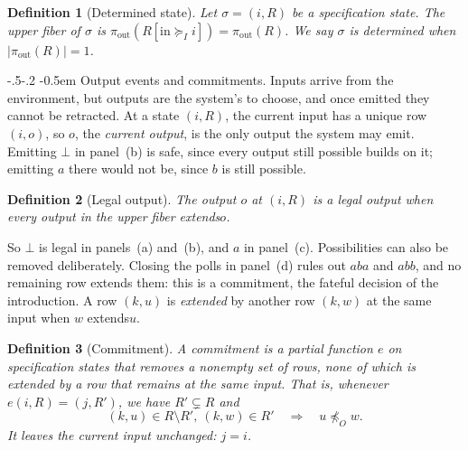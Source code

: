 \documentclass[sigconf]{cidr-2027}
\makeatletter
\newtheorem{definition}{Definition}
\theoremstyle{remark}
\renewcommand\paragraph{\@startsection{paragraph}{4}{\z@}%
  {-.5\baselineskip \@plus -2\p@ \@minus -.2\p@}%
  {-0.5em}%
  {\normalfont\bfseries}}
\newcommand{\OutputOrd}{\preceq_O}
\newcommand{\InputGe}{\succeq_I}
\newcommand{\commitment}{commitment\xspace}
\newcommand{\commitments}{commitments\xspace}
\newcommand{\Commitment}{Commitment\xspace}
\newcommand{\outrel}{extends\xspace}          %
\newcommand{\outrelpast}{extended\xspace}     %
\makeatother
\begin{document}
\begin{definition}[Determined state]
\label{def:determined}
\textcolor{reviewed}{Let $\sigma = (i, R)$ be a specification state.} \textcolor{reviewed}{The upper fiber of $\sigma$
is $\pi_{\mathrm{out}}(R[\mathrm{in}\InputGe i]) = \pi_{\mathrm{out}}(R)$.} \textcolor{reviewed}{We say $\sigma$ is \emph{determined} when $|\pi_{\mathrm{out}}(R)|=1$.}
\end{definition}

\paragraph{Output events and \commitments.}
\textcolor{reviewed}{Inputs arrive from the environment, but outputs are the system's to choose, and
once emitted they cannot be retracted.} At a state $(i,R)$, the current input
has a unique row $(i,o)$, so $o$, the \emph{current output}, is the only output
the system may emit. \textcolor{reviewed}{Emitting $\bot$ in panel~(b) is safe, since every output
still possible builds on it; emitting $a$ there would not be, since $b$ is
still possible.}

\begin{definition}[Legal output]
\label{def:exposable}
The output $o$ at $(i,R)$ is a \emph{legal output} when every output in the
upper fiber \outrel $o$.
\end{definition}

\textcolor{reviewed}{So $\bot$ is legal in panels~(a) and~(b), and $a$ in panel~(c).} \textcolor{reviewed}{Possibilities
can also be removed deliberately.} \textcolor{reviewed}{Closing the polls in panel~(d) rules out
$aba$ and $abb$, and no remaining row \outrel them: this is a \commitment,
the fateful decision of the introduction.} A row $(k,u)$ is \emph{\outrelpast} by another
row $(k,w)$ at the same input when $w$ \outrel $u$.

\begin{definition}[\Commitment]
\label{def:commitment}
A \emph{\commitment} is a partial function $e$ on specification states that
removes a nonempty set of rows, none of which is \outrelpast by a row that
remains at the same input. That is, whenever $e(i,R)=(j,R')$, we have
$R'\subsetneq R$ and
\begin{equation}
  (k,u)\in R\setminus R',\ (k,w)\in R'
  \quad\Longrightarrow\quad
  u\not\OutputOrd w.
  \label{eq:commitment-unsubsumed}
\end{equation}
It leaves the current input unchanged: $j=i$.
\end{definition}
\end{document}
